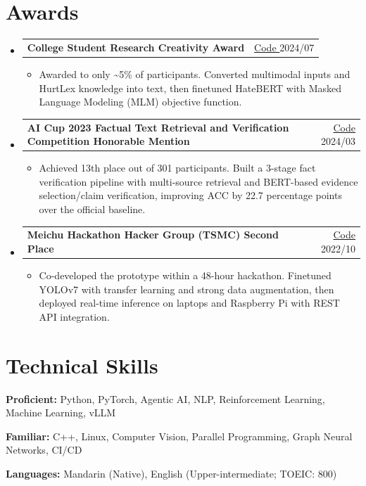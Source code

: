 \documentclass[a4paper,11pt]{article}
\makeatletter
\newcommand{\resumeMeta}[1]{\textcolor{metared}{\footnotesize #1}}
\newcommand{\resumeIconLink}[3]{%
  \href{#1}{%
    \color{linkblue}#2\hspace{0.3em}#3%
  }%
}
\newcommand{\resumeCode}[1]{%
  \resumeIconLink{#1}{\faGithub}{Code}%
}
\newcommand{\resumeSkills}[1]{%
  \vspace{-2pt}
  {\small
    \hspace{0.6em}%
    \textbf{\color{titletext}Skills:}
    \hspace{0.2em}
    \color{bodytext}#1
  }\par
  \vspace{-2pt}
}
\newcommand{\resumeAward}[3]{%
  \item
  \begin{tabular*}{\textwidth}[t]{l@{\extracolsep{\fill}}r}
    \textbf{\color{titletext}#1} & {\small\resumeCode{#3}}\hspace{0.8em}\resumeMeta{#2}
  \end{tabular*}\vspace{-2pt}
}
\newcommand{\resumeItemListStart}{%
  \begin{itemize}[leftmargin=1.5em,label=\textcolor{metared}{\raisebox{0.2ex}{\scriptsize$\bullet$}},itemsep=0.7pt,topsep=3pt,parsep=0pt,partopsep=0pt]
  \small
}
\newcommand{\resumeItem}[1]{\item #1}
\newcommand{\resumeItemListEnd}{\end{itemize}\vspace{-1.3pt}}
\makeatother
\begin{document}
\section{Awards}
\begin{itemize}[leftmargin=0pt,label={},itemsep=-2pt,topsep=0pt,parsep=0pt,partopsep=0pt]
  \resumeAward
  {College Student Research Creativity Award}
  {2024/07}
  {https://github.com/larrychen20011120/hateful-meme-project}
  \resumeItemListStart
    \resumeItem{Awarded to only \textasciitilde5\% of participants. Converted multimodal inputs and HurtLex knowledge into text, then finetuned HateBERT with Masked Language Modeling (MLM) objective function.}
  \resumeItemListEnd
  \resumeAward
  {AI Cup 2023 Factual Text Retrieval and Verification Competition \textemdash{} Honorable Mention}
  {2024/03}
  {https://github.com/larrychen20011120/aicup_fact_verification}
  \resumeItemListStart
    \resumeItem{Achieved 13th place out of 301 participants. Built a 3-stage fact verification pipeline with multi-source retrieval and BERT-based evidence selection/claim verification, improving ACC by 22.7 percentage points over the official baseline.}
  \resumeItemListEnd

  \resumeAward
  {Meichu Hackathon Hacker Group (TSMC) \textemdash{} Second Place}
  {2022/10}
  {https://github.com/larrychen20011120/tsmc-hackathon}
   \resumeItemListStart
    \resumeItem{Co-developed the prototype within a 48-hour hackathon. Finetuned YOLOv7 with transfer learning and strong data augmentation, then deployed real-time inference on laptops and Raspberry Pi with REST API integration.}
  \resumeItemListEnd
  
\end{itemize}\vspace{-3pt}

\section{Technical Skills}
\small
\textbf{\textcolor{titletext}{Proficient:}} Python, PyTorch, Agentic AI, NLP, Reinforcement Learning, Machine Learning, vLLM
\par\vspace{0.5pt}
\textbf{\textcolor{titletext}{Familiar:}} C++, Linux, Computer Vision, Parallel Programming, Graph Neural Networks, CI/CD
\par\vspace{0.5pt}
\textbf{\textcolor{titletext}{Languages:}} Mandarin (Native), English (Upper-intermediate; TOEIC: 800)
\end{document}
